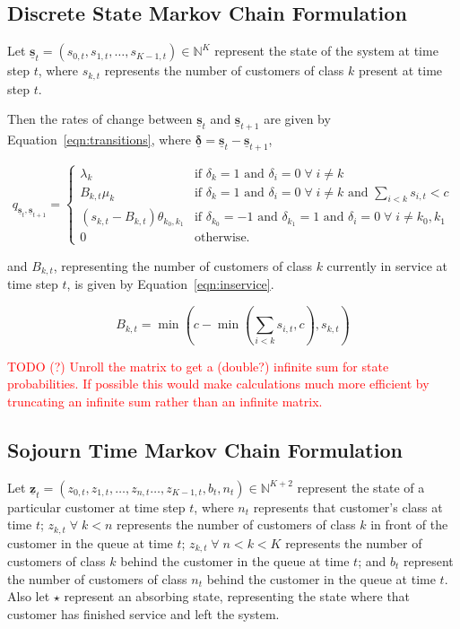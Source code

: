 \documentclass{article}
\begin{document}
\subsection{Discrete State Markov Chain Formulation}
Let
$\underline{\mathbf{s}}_t = (s_{0,t}, s_{1,t}, \dots, s_{K-1,t}) \in \mathbb{N}^K$
represent the state of the system at time step $t$, where $s_{k,t}$ represents
the number of customers of class $k$ present at time step $t$.

Then the rates of change between $\underline{\mathbf{s}}_t$ and
$\underline{\mathbf{s}}_{t+1}$ are given by Equation~\ref{eqn:transitions},
where $\underline{\mathbf{\delta}} = \underline{\mathbf{s}}_t - \underline{\mathbf{s}}_{t+1}$,

\begin{equation}\label{eqn:transitions}
q_{\underline{\mathbf{s}}_t, \underline{\mathbf{s}}_{t+1}} = 
\begin{cases}
\lambda_k & \text{if } \delta_k = 1 \text{ and } \delta_i = 0 \; \forall \; i \neq k \\
B_{k,t} \mu_k & \text{if } \delta_k = 1 \text{ and } \delta_i = 0 \; \forall \; i \neq k \text{ and } \sum_{i < k} s_{i,t} < c \\
(s_{k,t} - B_{k,t}) \theta_{k_0,k_1} & \text{if } \delta_{k_0} = -1 \text{ and } \delta_{k_1} = 1 \text{ and } \delta_i = 0 \; \forall \; i \neq k_0, k_1 \\
0 & \text{otherwise.}
\end{cases}
\end{equation}

and $B_{k,t}$, representing the number of customers of class $k$ currently in
service at time step $t$, is given by Equation~\ref{eqn:inservice}.

\begin{equation}\label{eqn:inservice}
B_{k,t} =\min\left(c - \min\left(\sum_{i < k} s_{i,t}, c\right), s_{k,t}\right)
\end{equation}

\textcolor{red}{TODO (?) Unroll the matrix to get a (double?) infinite sum for state probabilities. If possible this would make calculations much more efficient by truncating an infinite sum rather than an infinite matrix.}


\subsection{Sojourn Time Markov Chain Formulation}
Let $\underline{\mathbf{z}}_t = (z_{0,t}, z_{1,t}, \dots, z_{n,t} \dots, z_{K-1,t}, b_t, n_t) \in \mathbb{N}^{K+2}$
represent the state of a particular customer at time step $t$, where $n_t$
represents that customer's class at time $t$; $z_{k,t} \; \forall \; k < n$
represents the number of customers of class $k$ in front of the customer in the
queue at time $t$; $z_{k,t} \; \forall \; n < k < K$ represents the number of
customers of class $k$ behind the customer in the queue at time $t$; and $b_t$
represent the number of customers of class $n_t$ behind the customer in the
queue at time $t$.
Also let $\star$ represent an absorbing state, representing the state where that
customer has finished service and left the system.
\end{document}
